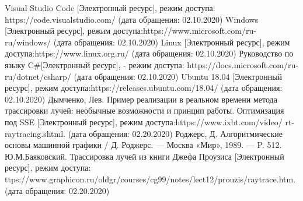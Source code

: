 \begin{thebibliography}{3}
	Visual Studio Code [Электронный ресурс], режим доступа: https://code.visualstudio.com/ (дата обращения: 02.10.2020)
	Windows [Электронный ресурс], режим доступа:https://www.microsoft.com/ru-ru/windows/ (дата обращения: 02.10.2020)
	Linux [Электронный ресурс], режим доступа:https://www.linux.org.ru/ (дата обращения: 02.10.2020)
	Руководство по языку C\#[Электронный ресурс], - режим доступа: https://docs.microsoft.com/ru-ru/dotnet/csharp/ (дата обращения: 02.10.2020)
	Ubuntu 18.04 [Электронный ресурс], режим доступа:https://releases.ubuntu.com/18.04/ (дата обращения: 02.10.2020)
	Дымченко, Лев. Пример реализации в реальном времени метода
	трассировки лучей: необычные возможности и принцип работы. Оптимизация
	под SSE [Электронный ресурс],  режим доступа:https://www.ixbt.com/video/
	rt-raytracing.shtml. (дата обращения: 02.20.2020)
	Роджерс, Д. Алгоритмические основы машинной графики / Д. Роджерс. — Москва «Мир», 1989. — P. 512.
	Ю.М.Баяковский. Трассировка лучей из книги Джефа Проузиса [Электронный ресурс],
	режим доступа: ttps://www.graphicon.ru/oldgr/courses/cg99/notes/lect12/prouzis/raytrace.htm. (дата обращения: 02.20.2020)
\end{thebibliography}
